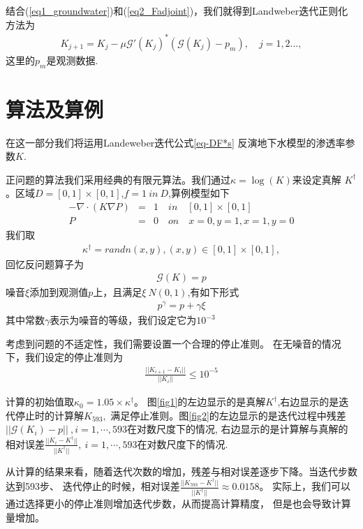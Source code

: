 \documentclass[a4paper,12pt,oneside,CJK]{cctbook}
\theoremstyle{definition}
\numberwithin{equation}{section}
\begin{document}
结合(\ref{eq1_groundwater})和(\ref{eq2_Fadjoint})，我们就得到Landweber迭代正则化方法为
\begin{eqnarray}\label{eq-DF*s}
    K_{j+1}=K_j-\mu \mathcal{G'}(K_j)^*(\mathcal{G}(K_j)-p_m), \quad j=1,2\ldots,
\end{eqnarray}
这里的$p_m$是观测数据.


\section{算法及算例}

在这一部分我们将运用Landeweber迭代公式\ref{eq-DF*s}
反演地下水模型的渗透率参数$K$.

正问题的算法我们采用经典的有限元算法。我们通过$\kappa=\log(K)$来设定真解
$K^{\dagger}$。区域$D=[0,1]\times[0,1]$,$f=1~in~D$,算例模型如下
\begin{eqnarray*}
    -\nabla\cdot(K\nabla P)&=&1 \quad in\quad [0,1]\times [0,1]\\
     P&=&0\quad on \quad x=0,y=1,x=1,y=0
\end{eqnarray*}
我们取
\begin{eqnarray}
   \kappa^{\dagger}=randn(x,y), (x,y)\in [0,1]\times [0,1],
\end{eqnarray}
回忆反问题算子为
\begin{eqnarray}
   \mathcal{G}(K)=p
\end{eqnarray}
噪音$\xi$添加到观测值$p$上，且满足$\xi~N(0,1)$,有如下形式
\begin{eqnarray*}
   p^{\gamma}=p+\gamma \xi
\end{eqnarray*}
其中常数$\gamma$表示为噪音的等级，我们设定它为$10^{-3}$

考虑到问题的不适定性，我们需要设置一个合理的停止准则。
在无噪音的情况下，我们设定的停止准则为
\begin{eqnarray}
   \frac{||K_{i+1}-K_i||}{||K_i||}\leq 10^{-5}
\end{eqnarray}

计算的初始值取$\kappa_0=1.05\times\kappa^{\dagger}$。
图\ref{fig1}的左边显示的是真解$K^{\dagger}$,右边显示的是迭代停止时的计算解$K_{593},$
满足停止准则。图\ref{fig2}的左边显示的是迭代过程中残差$||\mathcal{G}(K_i)-p||~,i=1,\cdots,593$在对数尺度下的情况,
右边显示的是计算解与真解的相对误差$\frac{||K_i-K^{\dagger}||}{||K^{\dagger}||},~i=1,\cdots,593$在对数尺度下的情况.

从计算的结果来看，随着迭代次数的增加，残差与相对误差逐步下降。当迭代步数达到593步、
迭代停止的时候，相对误差$\frac{||K_{593}-K^{\dagger}||}{||K^{\dagger}||}\approx 0.0158$。
实际上，我们可以通过选择更小的停止准则增加迭代步数，从而提高计算精度，
但是也会导致计算量增加。
\end{document}
